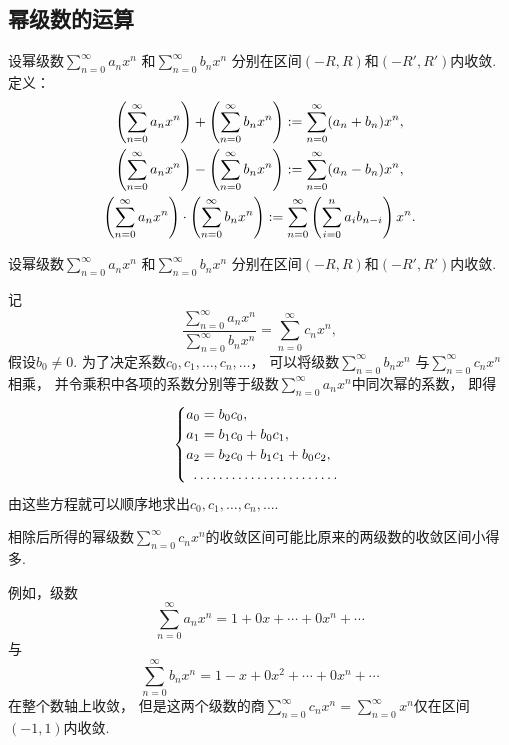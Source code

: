\subsection{幂级数的运算}
\begin{definition}
设幂级数\(\sum_{n=0}^\infty a_n x^n\)
和\(\sum_{n=0}^\infty b_n x^n\)
分别在区间\((-R,R)\)和\((-R',R')\)内收敛.
定义：
\begin{gather}
	\left(\sum_{n=0}^\infty a_n x^n\right)
	+ \left(\sum_{n=0}^\infty b_n x^n\right)
	:=
	\sum_{n=0}^\infty (a_n+b_n) x^n, \\
	\left(\sum_{n=0}^\infty a_n x^n\right)
	- \left(\sum_{n=0}^\infty b_n x^n\right)
	:=
	\sum_{n=0}^\infty (a_n-b_n) x^n, \\
	\left(\sum_{n=0}^\infty a_n x^n\right)
	\cdot \left(\sum_{n=0}^\infty b_n x^n\right)
	:=
	\sum_{n=0}^\infty \left(
		\sum_{i=0}^n a_i b_{n-i}
	\right) x^n.
\end{gather}
\end{definition}

\begin{definition}
设幂级数\(\sum_{n=0}^\infty a_n x^n\)
和\(\sum_{n=0}^\infty b_n x^n\)
分别在区间\((-R,R)\)和\((-R',R')\)内收敛.

记\[
	\frac{
		\sum_{n=0}^\infty a_n x^n
	}{
		\sum_{n=0}^\infty b_n x^n
	}
	= \sum_{n=0}^\infty c_n x^n,
\]
假设\(b_0 \neq 0\).
为了决定系数\(c_0,c_1,\dotsc,c_n,\dotsc\)，
可以将级数\(\sum_{n=0}^\infty b_n x^n\)
与\(\sum_{n=0}^\infty c_n x^n\)相乘，
并令乘积中各项的系数分别等于级数\(\sum_{n=0}^\infty a_n x^n\)中同次幂的系数，
即得\[
	\begin{cases}
		a_0 = b_0 c_0, \\
		a_1 = b_1 c_0 + b_0 c_1, \\
		a_2 = b_2 c_0 + b_1 c_1 + b_0 c_2, \\
		\hdotsfor{1} \\
	\end{cases}
\]
由这些方程就可以顺序地求出\(c_0,c_1,\dotsc,c_n,\dotsc\).

相除后所得的幂级数\(\sum_{n=0}^\infty c_n x^n\)的收敛区间可能比原来的两级数的收敛区间小得多.
\end{definition}

例如，级数\[
	\sum_{n=0}^\infty a_n x^n
	= 1 + 0x + \dotsb + 0x^n + \dotsb
\]与\[
	\sum_{n=0}^\infty b_n x^n
	= 1 - x + 0x^2 + \dotsb + 0x^n + \dotsb
\]在整个数轴上收敛，
但是这两个级数的商\(\sum_{n=0}^\infty c_n x^n
= \sum_{n=0}^\infty x^n\)仅在区间\((-1,1)\)内收敛.
